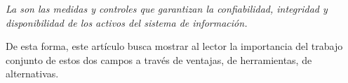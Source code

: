 \begin{multicols}{2}

\begin{entradilla}
{\em La {\color{introcolor}{seguridad informática}} son las medidas y controles que garantizan la confiabilidad, integridad y disponibilidad de los activos del sistema de información.}
\end{entradilla}

De esta forma, este artículo busca mostrar al lector la importancia del trabajo conjunto de estos dos campos a través de ventajas, de herramientas, de alternativas.




\end{multicols}
